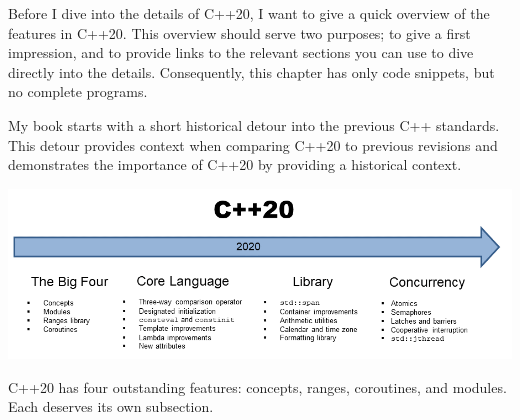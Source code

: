 

Before I dive into the details of C++20, I want to give a quick overview of the features in C++20.
This overview should serve two purposes; to give a first impression, and to provide links to the relevant sections you can use to dive directly into the details. Consequently, this chapter has only code snippets, but no complete programs.

My book starts with a short historical detour into the previous C++ standards. This detour provides context when comparing C++20 to previous revisions and demonstrates the importance of C++20 by providing a historical context.

\begin{center}
\includegraphics[width=1.0\textwidth]{content/2/chapter3/images/1.png}\\
\end{center}

C++20 has four outstanding features: concepts, ranges, coroutines, and modules. Each deserves its own subsection.








